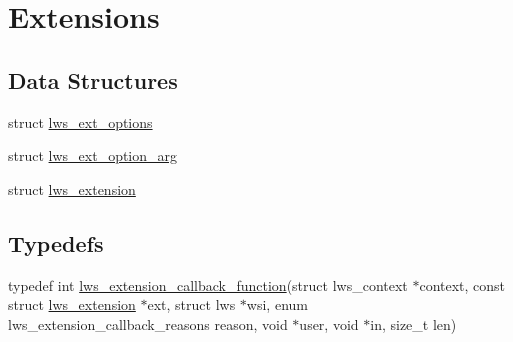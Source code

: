 \hypertarget{group__extensions}{}\section{Extensions}
\label{group__extensions}
\subsection*{Data Structures}
\begin{DoxyCompactItemize}
\item 
struct \hyperlink{structlws__ext__options}{lws\+\_\+ext\+\_\+options}
\item 
struct \hyperlink{structlws__ext__option__arg}{lws\+\_\+ext\+\_\+option\+\_\+arg}
\item 
struct \hyperlink{structlws__extension}{lws\+\_\+extension}
\end{DoxyCompactItemize}
\subsection*{Typedefs}
\begin{DoxyCompactItemize}
\item 
typedef int \hyperlink{group__extensions_gaae7169b2cd346b34fa33d0250db2afd0}{lws\+\_\+extension\+\_\+callback\+\_\+function}(struct lws\+\_\+context $\ast$context, const struct \hyperlink{structlws__extension}{lws\+\_\+extension} $\ast$ext, struct lws $\ast$wsi, enum lws\+\_\+extension\+\_\+callback\+\_\+reasons reason, void $\ast$user, void $\ast$in, size\+\_\+t len)
\end{DoxyCompactItemize}
